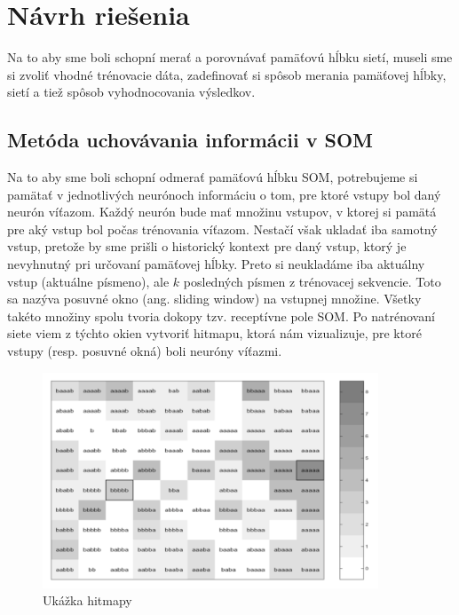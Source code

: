 \chapter{Návrh riešenia}
Na to aby sme boli schopní merať a porovnávať pamäťovú hĺbku sietí, museli sme si
zvoliť vhodné trénovacie dáta, zadefinovať si spôsob merania pamäťovej hĺbky,
sietí a tiež spôsob vyhodnocovania výsledkov.

\section{Metóda uchovávania informácii v SOM}
Na to aby sme boli schopní odmerať pamäťovú hĺbku SOM, potrebujeme si pamätať v jednotlivých
neurónoch informáciu o tom, pre ktoré vstupy bol daný neurón víťazom.
Každý neurón bude mať množinu vstupov, v ktorej si pamätá pre aký vstup bol počas trénovania víťazom. 
Nestačí však ukladať iba samotný vstup, pretože by sme prišli o historický kontext pre daný vstup, 
ktorý je nevyhnutný pri určovaní pamäťovej hĺbky. 
Preto si neukladáme iba aktuálny vstup (aktuálne písmeno), 
ale $k$ posledných písmen z trénovacej sekvencie.
Toto sa nazýva posuvné okno (ang. sliding window) na vstupnej množine. 
Všetky takéto množiny spolu tvoria dokopy tzv. receptívne pole SOM.
Po natrénovaní siete viem z týchto okien vytvoriť hitmapu, 
ktorá nám vizualizuje, pre ktoré vstupy (resp. posuvné okná) boli neuróny víťazmi.

\begin{figure}[H]
	\centering
	\includegraphics[width=10cm]{assets/receptive_field}
	\caption{Ukážka hitmapy}
\end{figure}
 
